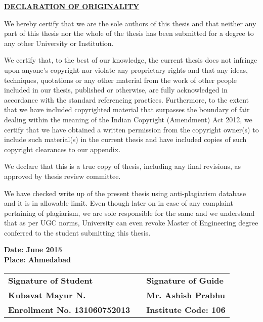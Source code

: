 \thispagestyle{plain}


\begin{center}
	\midsize\textbf{\underline {DECLARATION OF ORIGINALITY}}
\end{center}
	

We hereby certify that we are the sole authors of this thesis and that neither any part of this thesis nor the whole of the thesis has been submitted for a degree to any other University or Institution. \par

We certify that, to the best of our knowledge, the current thesis does not infringe upon anyone's copyright nor violate any proprietary rights and that any ideas, techniques, quotations or any other material from the work of other people included in our thesis, published or otherwise, are fully acknowledged in accordance with the standard referencing practices. Furthermore, to the extent that we have included copyrighted material that surpasses the boundary of fair dealing within the meaning of the Indian Copyright (Amendment) Act 2012, we certify that we have obtained a written permission from the copyright owner(s) to include such material(s) in the current thesis and have included copies of such copyright clearances to our appendix. \par

We declare that this is a true copy of thesis, including any final revisions, as approved by thesis review committee. \par

We have checked write up of the present thesis using anti-plagiarism database and it is in allowable limit. Even though later on in case of any complaint pertaining of plagiarism, we are sole responsible for the same and we understand that as per UGC norms, University can even revoke Master of Engineering degree conferred to the student submitting this thesis.

    \vspace {0.5cm}
    
    \textbf{Date: June 2015} \\
    \textbf{Place: Ahmedabad}
   
   \vspace{0.5cm}
    \begin{tabular}{l m{1cm} l}
    	\textbf{Signature of Student} & &\textbf{Signature of Guide} \\
    	\textbf{Kubavat Mayur N.} & &\textbf{Mr. Ashish Prabhu}\\
	    \textbf{Enrollment No. 131060752013} & & \textbf{Institute Code: 106}
    \end{tabular}
    